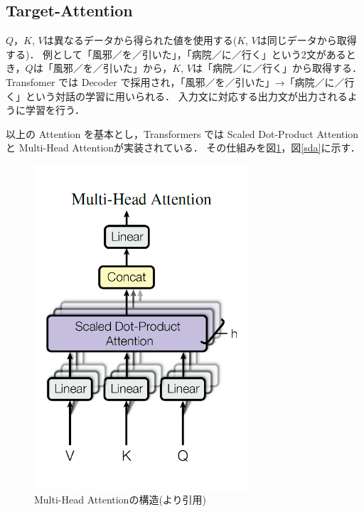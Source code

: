 \subsection{Target-Attention \label{c4s3-1b}}
${Q}$，${K}$, ${V}$は異なるデータから得られた値を使用する(${K}$, ${V}$は同じデータから取得する)．
例として「風邪／を／引いた」，「病院／に／行く」という2文があるとき，${Q}$は「風邪／を／引いた」から，${K}$, ${V}$は「病院／に／行く」から取得する．
 Transfomer では Decoder で採用され，「風邪／を／引いた」→「病院／に／行く」という対話の学習に用いられる．
入力文に対応する出力文が出力されるように学習を行う．

以上の Attention を基本とし，Transformers では Scaled Dot-Product Attention と Multi-Head Attentionが実装されている．
その仕組みを図\ref{mha}，図\ref{sda}に示す．

\begin{figure}[H]
	\centering
	\includegraphics[width=80mm]{image/transformer-multi-head-attention.png}
	\caption{Multi-Head Attentionの構造(\cite{bert}より引用)}
	\label{mha}
\end{figure}

